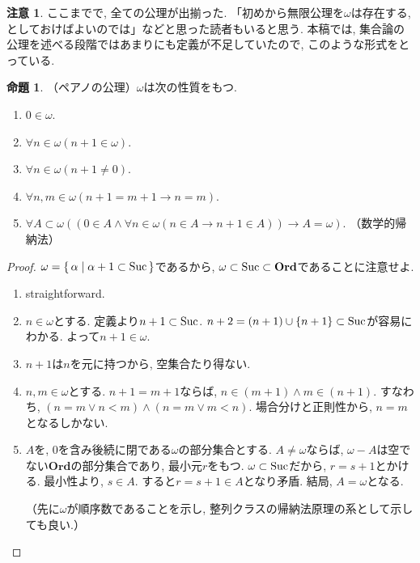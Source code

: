 \documentclass[a4paper, twoside]{bxjsarticle}
\theoremstyle{definition}
\newtheorem{prop}[thm]{命題}
\newtheorem{rem}[thm]{注意}
\begin{document}
        \begin{rem}
            ここまでで, 全ての公理が出揃った. 「初めから無限公理を$\omega$は存在する, としておけばよいのでは」などと思った読者もいると思う. 本稿では, 集合論の公理を述べる段階ではあまりにも定義が不足していたので, このような形式をとっている. 
        \end{rem}
        \begin{prop}
            （ペアノの公理）$\omega$は次の性質をもつ.
            \begin{enumerate}
                \item $0\in \omega$.
                \item $\forall n\in \omega(n+1\in \omega)$.
                \item $\forall n\in \omega(n+1 \neq 0)$.
                \item $\forall n, m\in \omega(n+1 = m+1 \to n=m)$.
                \item $\forall A\subset\omega((0\in A\land \forall n\in\omega(n\in A\to n+1\in A))\to A=\omega)$. （数学的帰納法）
            \end{enumerate}
        \end{prop}
        \begin{proof}
            $\omega = \set{\alpha|\alpha+1\subset{\rm Suc}}$であるから, $\omega \subset {\rm Suc}\subset \textbf{Ord}$であることに注意せよ.
            \begin{enumerate}
                \item straightforward.
                \item $n\in\omega$とする. 定義より$n+1\subset{\rm Suc}$. $n+2 = (n+1)\cup\{n+1\}\subset{\rm Suc}$が容易にわかる. よって$n+1\in\omega$.
                \item $n+1$は$n$を元に持つから, 空集合たり得ない.
                \item $n, m\in\omega$とする. $n+1=m+1$ならば, $n\in(m+1)\land m\in(n+1)$. すなわち, $(n=m\lor n<m)\land (n=m\lor m<n)$. 場合分けと正則性から, $n=m$となるしかない.
                \item $A$を, $0$を含み後続に閉である$\omega$の部分集合とする. $A\neq \omega$ならば, $\omega-A$は空でない$\textbf{Ord}$の部分集合であり, 最小元$r$をもつ. $\omega\subset{\rm Suc}$だから, $r=s+1$とかける. 最小性より, $s\in A$. すると$r= s+1\in A$となり矛盾. 結局, $A=\omega$となる. 
                
                （先に$\omega$が順序数であることを示し, 整列クラスの帰納法原理の系として示しても良い.）
            \end{enumerate}
        \end{proof}
\end{document}
